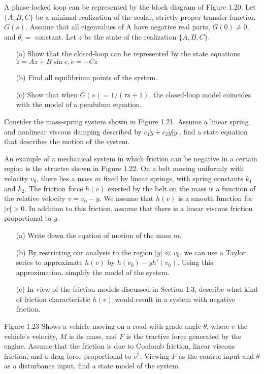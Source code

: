 \begin{exer}
A phase-locked loop can be represented by the block diagram of Figure 1.20. Let
$\{A,B,C\}$ be a minimal realization of the scalar, strictly proper transfer function
$G(s)$. Assume that all eigenvalues of A have negative real parts, $G(0)\neq0$,
and $\theta_i=$ constant. Let $z$ be the state of the realization $\{A,B,C\}$.
\begin{enumerate}
\item[(a)] Show that the closed-loop can be represented by the state equations \\
$\dot{z}=Az+B\sin e, \dot{e}=-Cz$
\item[(b)] Find all equilibrium points of the system.
\item[(c)] Show that when $G(s)=1/(\tau s + 1)$, the closed-loop model coincides 
with the model of a pendulum equation.
\end{enumerate}
\end{exer}

\begin{exer}
Consider the mass-spring system shown in Figure 1.21. Assume a linear spring and 
nonlinear viscous damping described by $c_1\dot{y}+c_2\dot{y}|\dot{y}|$, find a 
state equation that describes the motion of the system.
\end{exer}

\begin{exer}
An example of a mechanical system in which friction can be negative in a certain 
region is the structre shown in Figure 1.22. On a belt moving uniformly with
velocity $v_0$, there lies a mass $m$ fixed by linear springs, with spring 
constants $k_1$ and $k_2$. The friction force $h(v)$ exerted by the belt on the 
mass is a function of the relative velocity $v=v_0-\dot{y}$. We assume that 
$h(v)$ is a smooth function for $|v|>0$. In addition to this friction, assume
that there is a linear viscous friction proportional to $\dot{y}$.
\begin{enumerate}
\item[(a)] Write down the eqation of motion of the mass $m$.
\item[(b)] By restricting our analysis to the region $|\dot{y}| \ll v_0$, we
can use a Taylor series to approximate $h(v)$ by $h(v_0)-\dot{y}h'(v_0)$. Using
this approximation, simplify the model of the system.
\item[(c)] In view of the friction models discussed in Section 1.3, describe 
what kind of friction characteristic $h(v)$ would result in a system with 
negative friction.
\end{enumerate}
\end{exer}

\begin{exer}
Figure 1.23 Shows a vehicle moving on a road with grade angle $\theta$, where $v$
the vehicle's velocity, $M$ is its mass, and $F$ is the tractive force generated 
by the engine. Assume that the friction is due to Coulomb friction, linear viscous
friction, and a drag force proportional to $v^2$. Viewing $F$ as the control input 
and $\theta$ as a disturbance input, find a state model of the system.
\end{exer}
